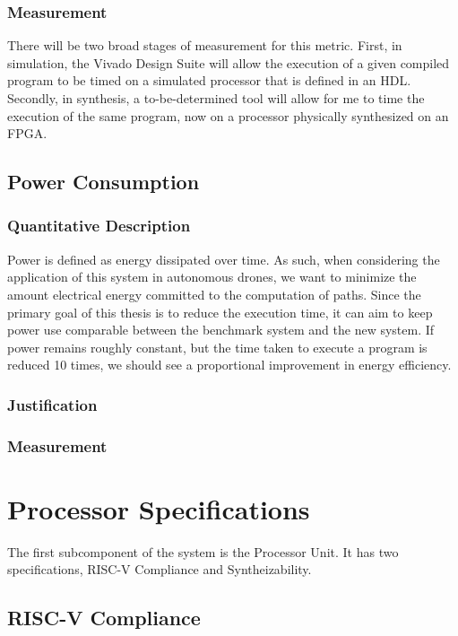 \documentclass[11pt, oneside]{article}      %
\begin{document}
\subsubsection{Measurement}
There will be two broad stages of measurement for this metric. First, in simulation, the Vivado Design Suite\cite{Vivado} will allow the execution of a given compiled program to be timed on a simulated processor that is defined in an \ac{HDL}. Secondly, in synthesis, a to-be-determined tool will allow for me to time the execution of the same program, now on a processor physically synthesized on an FPGA. 

\subsection{Power Consumption}
\subsubsection{Quantitative Description}
Power is defined as energy dissipated over time. As such, when considering the application of this system in autonomous drones, we want to minimize the amount electrical energy committed to the computation of paths. Since the primary goal of this thesis is to reduce the execution time, it can aim to keep power use comparable between the benchmark system and the new system. If power remains roughly constant, but the time taken to execute a program is reduced 10 times, we should see a proportional improvement in energy efficiency.
\subsubsection{Justification}
\subsubsection{Measurement}
\clearpage




\section{Processor Specifications}
The first subcomponent of the system is the Processor Unit. It has two specifications, RISC-V Compliance and Syntheizability.

\subsection{RISC-V Compliance} \label{subsection:riscvCompliance}
\end{document}
